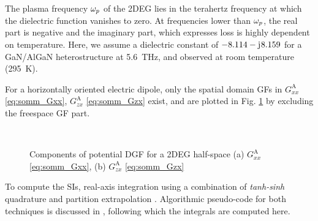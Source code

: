 \documentclass[12pt]{article}
\begin{document}
The plasma frequency $\omega_p$ of the 2DEG lies in the terahertz frequency at which the dielectric function vanishes to zero. At frequencies lower than $\omega_p$, the real part is negative and the imaginary part, which expresses loss is highly dependent on temperature. Here, we assume a dielectric constant of $ -8.114 - \mathrm{j}\mkern1mu 8.159$ for a GaN/AlGaN heterostructure at \SI{5.6}{\THz}, and observed at room temperature (\SI{295}{\kelvin}).

For a horizontally oriented electric dipole, only the spatial domain GFs in $G_{xx}^\mathrm{A}$ \eqref{eq:somm_Gxx}, $G_{zx}^\mathrm{A}$ \eqref{eq:somm_Gzx} exist, and are plotted in Fig. \ref{fig:G^A_components_halfspace} by excluding the freespace GF part.
%
\begin{figure}[!htbp]
  \centering
  \\
  \caption{Components of potential DGF for a 2DEG half-space (a) $G_{xx}^\mathrm{A}$ \eqref{eq:somm_Gxx}, (b) $G_{zx}^\mathrm{A}$ \eqref{eq:somm_Gzx} }
  \label{fig:G^A_components_halfspace}
\end{figure}
To compute the SIs, real-axis integration using a combination of \emph{tanh-sinh} quadrature \cite{1974721,Golubovic2012,Koufogiannis2015} and partition extrapolation \cite{Michalski1998}. Algorithmic pseudo-code for both techniques is discussed in \cite{Michalski2016}, following which the integrals are computed here.
%
\end{document}

